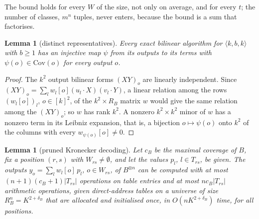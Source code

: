 \documentclass[11pt]{article}
\newtheorem{lemma}[theorem]{Lemma}
\theoremstyle{definition}
\theoremstyle{remark}
\newcommand{\abs}[1]{\lvert #1\rvert}
\newcommand{\mat}[3]{\langle #1,#2,#3\rangle} %
\newcommand{\Cov}{\mathrm{Cov}}               %
\newcommand{\cB}{c_B}                         %
\newcommand{\delB}{\delta_B}                  %
\newcommand{\RB}{R_B}                         %
\begin{document}
The bound holds for every $W$ of the size, not only on average, and for every $t$; the number of classes, $m^n$ tuples, never enters, because the bound is a sum that factorises.

\begin{lemma}[distinct representatives]\label{cp:T3}
Every exact bilinear algorithm for $\mat kbk$ with $b\ge1$ has an injective map $\psi$ from its outputs to its terms with $\psi(o)\in\Cov(o)$ for every output $o$.
\end{lemma}

\begin{proof}
The $k^2$ output bilinear forms $(XY)_o$ are linearly independent. Since $(XY)_o=\sum_lw_l[o](u_l\cdot X)(v_l\cdot Y)$, a linear relation among the rows $(w_l[o])_l$, $o\in[k]^2$, of the $k^2\times\RB$ matrix $w$ would give the same relation among the $(XY)_o$; so $w$ has rank $k^2$. A nonzero $k^2\times k^2$ minor of $w$ has a nonzero term in its Leibniz expansion, that is, a bijection $o\mapsto\psi(o)$ onto $k^2$ of the columns with every $w_{\psi(o)}[o]\ne0$.
\end{proof}

\begin{lemma}[pruned Kronecker decoding]\label{cp:T4}
Let $\cB$ be the maximal coverage of $B$, fix a position $(r,s)$ with $W_{rs}\ne\emptyset$, and let the values $p_l$, $l\in T_{rs}$, be given. The outputs $y_o=\sum_lw_l[o]\,p_l$, $o\in W_{rs}$, of $B^{\otimes n}$ can be computed with at most $(n+1)(\cB+1)\abs{T_{rs}}$ operations on table entries and at most $n\cB\abs{T_{rs}}$ arithmetic operations, given direct-address tables on a universe of size $\RB^n=K^{2+\delB}$ that are allocated and initialised once, in $O(nK^{2+\delB})$ time, for all positions.
\end{lemma}
\end{document}
